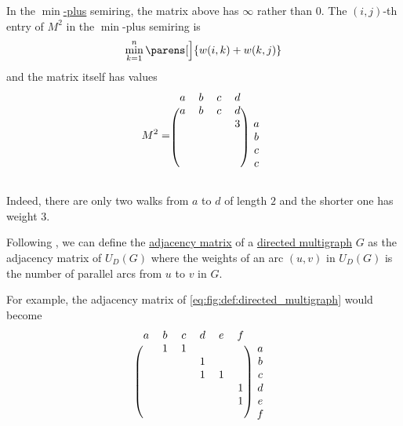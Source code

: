 \begin{example}
\begin{thmenum}
    In the \hyperref[def:tropical_semiring]{\( \min \)-plus} semiring, the matrix above has \( \infty \) rather than \( 0 \). The \( (i, j) \)-th entry of \( M^2 \) in the \( \min \)-plus semiring is
    \begin{equation*}
      \min_{k=1}^n \parens[\Big]{ w(i,k) + w(k,j) }
    \end{equation*}
    and the matrix itself has values
    \begin{equation*}
      M^2 =
      \begin{blockarray}{*{4}{c} c}
        a & b & c & d &  \\
      \begin{block}{(*{4}{c}) c}
        a & b & c & d &   \\
          &   &   & 3 & a \\
          &   &   &   & b \\
          &   &   &   & c \\
          &   &   &   & c \\
      \end{block}
      \end{blockarray}
    \end{equation*}

    Indeed, there are only two walks from \( a \) to \( d \) of length \( 2 \) and the shorter one has weight \( 3 \).

     Following , we can define the \hyperref[def:graph_adjacency_matrix]{adjacency matrix} of a \hyperref[def:directed_multigraph]{directed multigraph} \( G \) as the adjacency matrix of \hyperref[def:graph_functors/directed_forgetful]{\( U_D \)}\( (G) \) where the weights of an arc \( (u, v) \) in \( U_D(G) \) is the number of parallel arcs from \( u \) to \( v \) in \( G \).

    For example, the adjacency matrix of \eqref{eq:fig:def:directed_multigraph} would become
    \begin{equation}\label{eq:ex:def:graph_adjacency_matrix/multi}
      \begin{blockarray}{*{6}{c} c}
        a & b & c & d & e & f &   \\
      \begin{block}{(*{6}{c}) c}
          & 1 & 1 &   &   &   & a \\
          &   &   & 1 &   &   & b \\
          &   &   & 1 & 1 &   & c \\
          &   &   &   &   & 1 & d \\
          &   &   &   &   & 1 & e \\
          &   &   &   &   &   & f \\
      \end{block}
      \end{blockarray}
    \end{equation}
  \end{thmenum}
\end{example}

